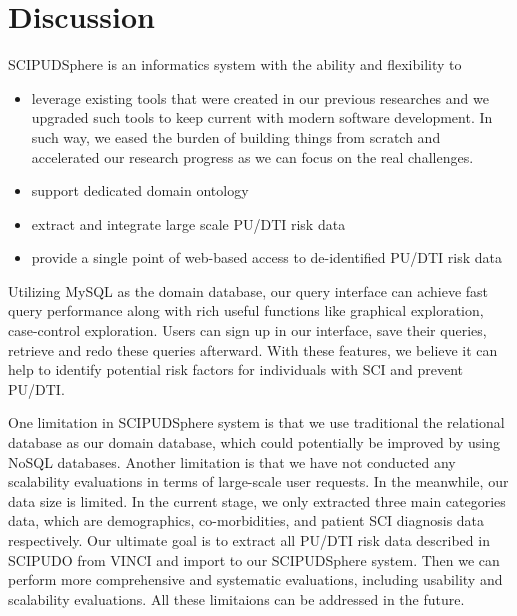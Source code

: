 \documentclass{amia}
\begin{document}
\section{Discussion}
SCIPUDSphere is an informatics system with the ability and flexibility to
\begin{itemize}
  \item leverage existing tools that were created in our previous researches and we upgraded such tools to keep current with modern software development. In such way, we eased the burden of building things from scratch and accelerated our research progress as we can focus on the real challenges.
  \item support dedicated domain ontology
  \item extract and integrate large scale PU/DTI risk data
  \item provide a single point of web-based access to de-identified PU/DTI risk data
\end{itemize}
Utilizing MySQL as the domain database, our query interface can achieve fast query performance along with rich useful functions like graphical exploration, case-control exploration. Users can sign up in our interface, save their queries, retrieve and redo these queries afterward. With these features, we believe it can help to identify potential risk factors for individuals with SCI and prevent PU/DTI. 

One limitation in SCIPUDSphere system is that we use traditional the relational database as our domain database, which could potentially be improved by using NoSQL databases. Another limitation is that we have not conducted any scalability evaluations in terms of large-scale user requests. In the meanwhile, our data size is limited. In the current stage, we only extracted three main categories data, which are demographics, co-morbidities, and patient SCI diagnosis data respectively. Our ultimate goal is to extract all PU/DTI risk data described in SCIPUDO from VINCI and import to our SCIPUDSphere system. Then we can perform more comprehensive and systematic evaluations, including usability and scalability evaluations. All these limitaions can be addressed in the future.

\end{document}
